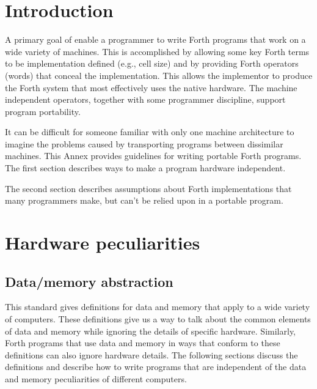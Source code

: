 \label{annex:port}

\section{Introduction} %
\label{port:intro}

A primary goal of  enable a programmer to write Forth programs that work on
a wide variety of machines.
This  is accomplished by allowing some key Forth terms to be
implementation defined (e.g., cell size)
and by providing Forth operators (words) that conceal the
implementation. This allows the implementor to
produce the Forth system that most effectively uses the native
hardware. The machine independent operators, together with some
programmer discipline, support program portability.

It can be difficult for someone familiar with only one machine
architecture to imagine the problems caused by transporting programs
between dissimilar machines.
This Annex provides guidelines for writing portable Forth programs.
The first section describes ways to make a program hardware independent.

The second section describes assumptions about Forth implementations
that many programmers make, but can't be relied upon in a portable program.


\section{Hardware peculiarities} %
\label{port:hardware}

\subsection{Data/memory abstraction} %

This standard gives definitions for data and memory that
apply to a wide variety of computers. These definitions give us a way
to talk about the common elements of data and memory while ignoring
the details of specific hardware. Similarly, Forth programs that
use data and memory in ways that conform to these definitions can
also ignore hardware details. The following sections discuss the
definitions and describe how to write programs that are independent
of the data and memory peculiarities of different computers.

